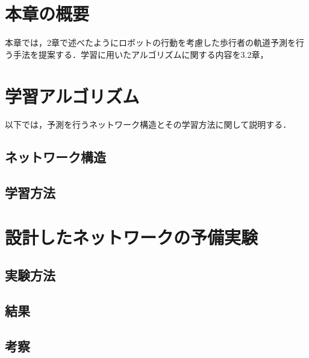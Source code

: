 
\section{本章の概要}

本章では，2章で述べたようにロボットの行動を考慮した歩行者の軌道予測を行う手法を提案する．学習に用いたアルゴリズムに関する内容を3.2章，

\section{学習アルゴリズム}

以下では，予測を行うネットワーク構造とその学習方法に関して説明する．

\subsection{ネットワーク構造}
\subsection{学習方法}

\section{設計したネットワークの予備実験}

\subsection{実験方法}
\subsection{結果}
\subsection{考察}

\newpage
